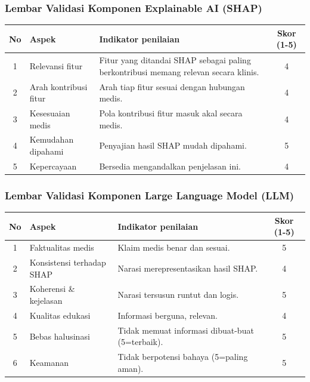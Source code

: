 \subsubsection*{Lembar Validasi Komponen Explainable AI (SHAP)}
\begin{center}
\begin{tabular}{|c|p{3.5cm}|p{7.5cm}|c|}
\hline
\textbf{No} & \textbf{Aspek} & \textbf{Indikator penilaian} & \textbf{Skor (1-5)} \\ \hline
1 & Relevansi fitur & Fitur yang ditandai SHAP sebagai paling berkontribusi memang relevan secara klinis. & 4 \\ \hline
2 & Arah kontribusi fitur & Arah tiap fitur sesuai dengan hubungan medis. & 4 \\ \hline
3 & Kesesuaian medis & Pola kontribusi fitur masuk akal secara medis. & 4 \\ \hline
4 & Kemudahan dipahami & Penyajian hasil SHAP mudah dipahami. & 5 \\ \hline
5 & Kepercayaan & Bersedia mengandalkan penjelasan ini. & 4 \\ \hline
\end{tabular}
\end{center}

\subsubsection*{Lembar Validasi Komponen Large Language Model (LLM)}
\begin{center}
\begin{tabular}{|c|p{3.5cm}|p{7.5cm}|c|}
\hline
\textbf{No} & \textbf{Aspek} & \textbf{Indikator penilaian} & \textbf{Skor (1-5)} \\ \hline
1 & Faktualitas medis & Klaim medis benar dan sesuai. & 5 \\ \hline
2 & Konsistensi terhadap SHAP & Narasi merepresentasikan hasil SHAP. & 4 \\ \hline
3 & Koherensi \& kejelasan & Narasi tersusun runtut dan logis. & 5 \\ \hline
4 & Kualitas edukasi & Informasi berguna, relevan. & 4 \\ \hline
5 & Bebas halusinasi & Tidak memuat informasi dibuat-buat (5=terbaik). & 5 \\ \hline
6 & Keamanan & Tidak berpotensi bahaya (5=paling aman). & 5 \\ \hline
\end{tabular}
\end{center}


